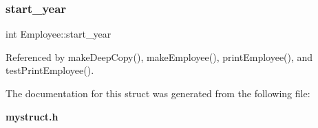 \subsubsection{start\+\_\+year}
{\footnotesize\ttfamily int Employee\+::start\+\_\+year}



Referenced by make\+Deep\+Copy(), make\+Employee(), print\+Employee(), and test\+Print\+Employee().



The documentation for this struct was generated from the following file\+:\begin{DoxyCompactItemize}
\item 
\textbf{ mystruct.\+h}\end{DoxyCompactItemize}
